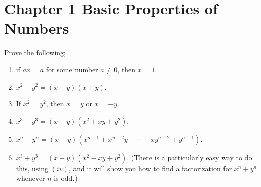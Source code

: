 \documentclass[12pt]{article}
\newenvironment{problem}[2][Problem]{\begin{trivlist}
\item[\hskip \labelsep {\bfseries #1}\hskip \labelsep {\bfseries #2.}]}{\end{trivlist}}
\begin{document}

\rhead{\today}



\section*{Chapter 1 Basic Properties of Numbers}

\begin{problem}{1.1}
Prove the following;
\begin{enumerate}[label=(\roman*)]
\item if $ax=a$ for some number $a\neq 0$, then $x=1$.
\item $x^2-y^2 = \left(x-y\right)\left(x+y\right)$.
\item If $x^2 =y^2$, then $x=y$ or $x=-y$.
\item $x^3 - y^3 = \left(x-y\right)\left(x^2+xy+y^2\right)$.
\item $x^n - y^n = \left(x-y\right)\left(x^{n-1} + x^{n-2}y + \cdots + xy^{n-2} + y^{n-1}\right)$.
\item $x^3 + y^3 = \left(x+y\right)\left(x^2-xy+y^2\right)$. (There is a particularly easy way to do this, using $\left(iv\right)$, and it will show you how to find a factorization for $x^n+y^n$ whenever $n$ is odd.)
\end{enumerate}
\end{problem}
\end{document}

